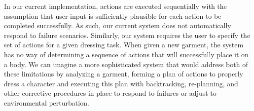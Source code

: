 In our current implementation, actions are executed sequentially with the assumption that user input is sufficiently plausible for each action to be completed successfully. As such, our current system does not automatically respond to failure scenarios. Similarly, our system requires the user to specify
the set of actions for a given dressing task. When given a new garment,
the system has no way of determining a sequence of actions that will
successfully place it on a body.  We can imagine a more sophisticated
system that would address both of these limitations by analyzing a garment, forming a plan of
actions to properly dress a character and executing this plan with backtracking, re-planning, and other corrective procedures in place to respond to failures or adjust to environmental perturbation.  

